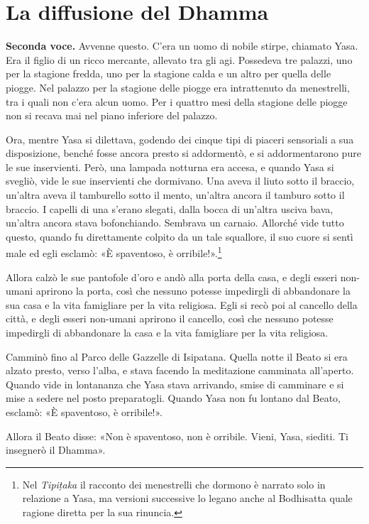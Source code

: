 \chapter{La diffusione del Dhamma}

\textbf{Seconda voce.} Avvenne questo. C’era un uomo di nobile stirpe, chiamato
Yasa. Era il figlio di un ricco mercante, allevato tra gli agi.
Possedeva tre palazzi, uno per la stagione fredda, uno per la stagione
calda e un altro per quella delle piogge. Nel palazzo per la stagione
delle piogge era intrattenuto da menestrelli, tra i quali non c’era
alcun uomo. Per i quattro mesi della stagione delle piogge non si recava
mai nel piano inferiore del palazzo.


Ora, mentre Yasa si dilettava, godendo dei cinque tipi di piaceri
sensoriali a sua disposizione, benché fosse ancora presto si addormentò,
e si addormentarono pure le sue inservienti. Però, una lampada notturna
era accesa, e quando Yasa si svegliò, vide le sue inservienti che
dormivano. Una aveva il liuto sotto il braccio, un’altra aveva il
tamburello sotto il mento, un’altra ancora il tamburo sotto il braccio.
I capelli di una s’erano slegati, dalla bocca di un’altra usciva bava,
un’altra ancora stava bofonchiando. Sembrava un carnaio. Allorché vide
tutto questo, quando fu direttamente colpito da un tale squallore, il
suo cuore si sentì male ed egli esclamò: «È spaventoso, è
orribile!».\footnote{Nel \emph{Tipiṭaka} il racconto dei menestrelli che dormono è narrato solo in relazione a Yasa, ma versioni successive lo legano anche al Bodhisatta quale ragione diretta per la sua rinuncia.}


Allora calzò le sue pantofole d’oro e andò alla porta della casa, e
degli esseri non-umani aprirono la porta, così che nessuno potesse
impedirgli di abbandonare la sua casa e la vita famigliare per la vita
religiosa. Egli si recò poi al cancello della città, e degli esseri
non-umani aprirono il cancello, così che nessuno potesse impedirgli di
abbandonare la casa e la vita famigliare per la vita religiosa.


Camminò fino al Parco delle Gazzelle di Isipatana. Quella notte il Beato
si era alzato presto, verso l’alba, e stava facendo la meditazione
camminata all’aperto. Quando vide in lontananza che Yasa stava
arrivando, smise di camminare e si mise a sedere nel posto preparatogli.
Quando Yasa non fu lontano dal Beato, esclamò: «È spaventoso, è
orribile!».


Allora il Beato disse: «Non è spaventoso, non è orribile. Vieni, Yasa,
siediti. Ti insegnerò il Dhamma».


